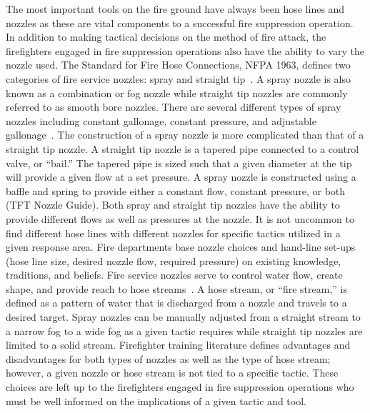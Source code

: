 \documentclass[12pt,oneside]{book}
\begin{document}
The most important tools on the fire ground have always been hose lines and nozzles as these are vital components to a successful fire suppression operation. In addition to making tactical decisions on the method of fire attack, the firefighters engaged in fire suppression operations also have the ability to vary the nozzle used. The Standard for Fire Hose Connections, NFPA 1963, defines two categories of fire service nozzles: spray and straight tip~\cite{NFPA1963}. A spray nozzle is also known as a combination or fog nozzle while straight tip nozzles are commonly referred to as smooth bore nozzles. There are several different types of spray nozzles including constant gallonage, constant pressure, and adjustable gallonage~\cite{FEHandbook}. The construction of a spray nozzle is more complicated than that of a straight tip nozzle. A straight tip nozzle is a tapered pipe connected to a control valve, or ``bail.'' The tapered pipe is sized such that a given diameter at the tip will provide a given flow at a set pressure. A spray nozzle is constructed using a baffle and spring to provide either a constant flow, constant pressure, or both (TFT Nozzle Guide). Both spray and straight tip nozzles have the ability to provide different flows as well as pressures at the nozzle. It is not uncommon to find different hose lines with different nozzles for specific tactics utilized in a given response area. Fire departments base nozzle choices and hand-line set-ups (hose line size, desired nozzle flow, required pressure) on existing knowledge, traditions, and beliefs. Fire service nozzles serve to control water flow, create shape, and provide reach to hose streams~\cite{Essentials6}. A hose stream, or ``fire stream,'' is defined as a pattern of water that is discharged from a nozzle and travels to a desired target. Spray nozzles can be manually adjusted from a straight stream to a narrow fog to a wide fog as a given tactic requires while straight tip nozzles are limited to a solid stream. Firefighter training literature defines advantages and disadvantages for both types of nozzles as well as the type of hose stream; however, a given nozzle or hose stream is not tied to a specific tactic. These choices are left up to the firefighters engaged in fire suppression operations who must be well informed on the implications of a given tactic and tool.
\end{document}
